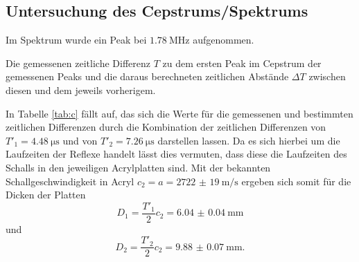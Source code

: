 \subsection{Untersuchung des Cepstrums/Spektrums}
Im Spektrum wurde ein Peak bei $\SI{1.78}{\mega\hertz}$ aufgenommen.
\begin{table}
	\centering
	\caption{Die gemessenen zeitliche Differenz $T$ zu dem ersten Peak im Cepstrum der gemessenen Peaks und die daraus berechneten zeitlichen Abstände $\Delta T$ zwischen diesen und dem jeweils vorherigem.}
	
\end{table}
In Tabelle \ref{tab:c} fällt auf, das sich die Werte für die gemessenen und bestimmten zeitlichen Differenzen durch die Kombination der zeitlichen Differenzen von $T'_1=\SI{4.48}{\micro\second}$ und von $T'_2=\SI{7.26}{\micro\second}$ darstellen lassen. Da es sich hierbei um die Laufzeiten der Reflexe handelt lässt dies vermuten, dass diese die Laufzeiten des Schalls in den jeweiligen Acrylplatten sind.
Mit der bekannten Schallgeschwindigkeit in Acryl $c_2=a=\SI{2722(19)}{\meter\per\second}$ ergeben sich somit für die Dicken der Platten
\begin{equation}
D_1=\frac{T'_1}{2} c_2=\SI{6.04(4)}{\milli\meter}
\end{equation}
und
\begin{equation}
D_2=\frac{T'_2}{2} c_2=\SI{9.88(7)}{\milli\meter}\text{.}
\end{equation}


